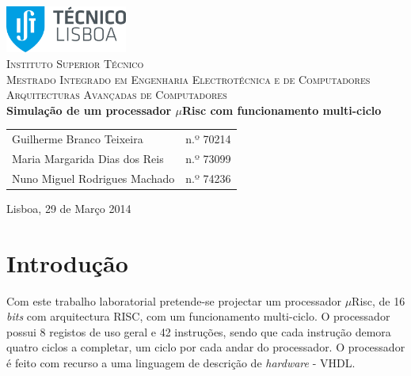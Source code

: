 \documentclass[11pt]{article}
\numberwithin{equation}{section}
\begin{document}
\begin{titlepage}
\begin{center}

\hfill \break
\hfill \break

\includegraphics[width=0.3\textwidth]{./logo}~\\[1cm]

\textsc{\LARGE Instituto Superior Técnico}\\[0.25cm]
\textsc{\Large Mestrado Integrado em Engenharia Electrotécnica e de Computadores}\\[1.8cm]
\textsc{\huge Arquitecturas Avançadas de Computadores}\\[0.25cm]

{\huge \bfseries Simulação de um processador $\mu$Risc com funcionamento multi-ciclo\\[1.2cm]}

\begin{tabular}{ l l }
Guilherme Branco Teixeira & \hspace{2mm} n.º 70214 \\ 
Maria Margarida Dias dos Reis & \hspace{2mm} n.º 73099 \\
Nuno Miguel Rodrigues Machado & \hspace{2mm} n.º 74236 
\end{tabular}

\vfill

{\large Lisboa, 29 de Março 2014} 

\end{center}
\end{titlepage}

\clearpage

\tableofcontents
\pagebreak

\clearpage
{}

\section{Introdução}

Com este trabalho laboratorial pretende-se projectar um processador $\mu$Risc, de 16 \textit{bits} com arquitectura RISC, com um funcionamento multi-ciclo. O processador possui 8 registos de uso geral e 42 instruções, sendo que cada instrução demora quatro ciclos a completar, um ciclo por cada andar do processador. O processador é feito com recurso a uma linguagem de descrição de \textit{hardware} - VHDL.
\end{document}
